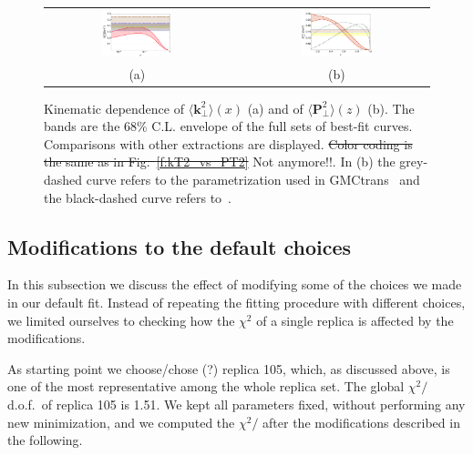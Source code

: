 \documentclass[aps,preprintnumbers,showpacs,nofootinbib,superscriptaddress,floatfix]{revtex4}
\newcommand{\AS}[1]{{\textcolor[rgb]{1,0,1}{#1}}}
\newcommand{\T}{\perp}
\begin{document}
\begin{figure}[h!]
\centering
\begin{tabular}{ccc}
\includegraphics[width=0.40\textwidth]{plots/kT2av_Compare_with_other_extractions_flINDEP.pdf}
&\hspace{0.001cm}
&
\includegraphics[width=0.40\textwidth]{plots/PT2av_Compare_with_other_extractions_flINDEP.pdf}
\\
(a) && (b)
\end{tabular}
\caption{Kinematic dependence of $\big \langle \bm{k}_{\T}^2 \big \rangle (x)$ (a) and of $\big \langle \bm{P}_{\perp}^2 \big \rangle (z)$ (b). The bands are the $68\%$ C.L. envelope of the full sets of best-fit curves. Comparisons with other extractions are displayed. \AS{\sout{Color coding is the same as in Fig.~\ref{f:kT2_vs_PT2}} Not anymore!!}.  In (b) the grey-dashed curve refers to the parametrization used in GMCtrans~\cite{gmctrans} and the black-dashed curve refers \AS{to~\cite{Anselmino:1999pw}. }}
\label{f:avmomenta_68CL}
\end{figure}


\subsection{Modifications to the default choices}
\label{ss:replica105}


In this subsection we discuss the effect of modifying some of the choices we
made in our default fit. Instead of repeating the fitting procedure with
different choices, we limited ourselves to checking how the $\chi^2$ of a single
replica is affected by the modifications. 

As starting point we \AS{choose/chose (?)} replica
105, which, as discussed above, is one of the most representative among the
whole replica set. 
The global $\chi^2/$d.o.f.\ of replica 105 is 1.51. We kept all parameters
fixed, without performing any new minimization, 
and we computed the $\chi^2/$ after the modifications described in the
following.
\end{document}

